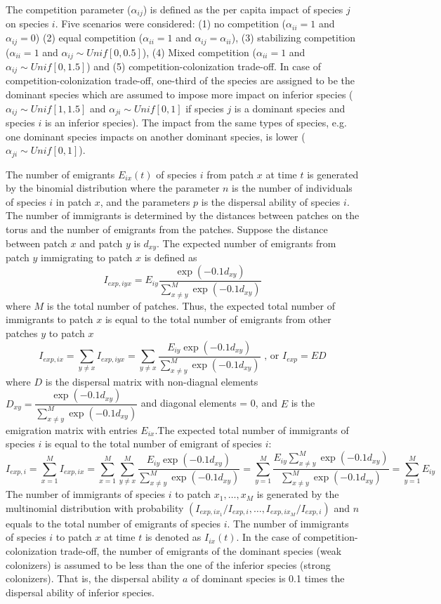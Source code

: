 The competition parameter ($\alpha_{ij}$) is defined as the per capita impact of species $j$ on species $i$. Five scenarios were considered: (1) no competition ($\alpha_{ii}=1$ and $\alpha_{ij}=0$) (2) equal competition ($\alpha_{ii}=1$ and $\alpha_{ij}=\alpha_{ii}$), (3) stabilizing competition ($\alpha_{ii}=1$ and $\alpha_{ij}\sim Unif[0,0.5]$), (4) Mixed competition ($\alpha_{ii}=1$ and $\alpha_{ij}\sim Unif[0,1.5]$) and (5) competition-colonization trade-off. In case of competition-colonization trade-off, one-third of the species are assigned to be the dominant species which are assumed to impose more impact on inferior species ($\alpha_{ij}\sim Unif[1,1.5]$ and $\alpha_{ji}\sim Unif[0,1]$ if species $j$ is a dominant species and species $i$ is an inferior species). The impact from the same types of species, e.g. one dominant species impacts on another dominant species, is lower ($\alpha_{ji}\sim Unif[0,1]$). 

The number of emigrants $E_{ix}(t)$ of species $i$ from patch $x$ at time $t$ is generated by the binomial distribution where the parameter $n$ is the number of individuals of species $i$ in patch $x$, and the parameters $p$ is the dispersal ability of species $i$. The number of immigrants is determined by the distances between patches on the torus and the number of emigrants from the patches. Suppose the distance between patch $x$ and patch $y$ is $d_{xy}$. The expected number of emigrants from patch $y$ immigrating to patch $x$ is defined as 
\[
I_{exp,iyx} = E_{iy}\dfrac{\exp(-0.1d_{xy})}{\sum_{x \neq y}^M \exp(-0.1d_{xy})}
\]
where $M$ is the total number of patches. Thus, the expected total number of immigrants to patch $x$ is equal to the total number of emigrants from other patches $y$ to patch $x$ 
\[
I_{exp,ix} = \sum_{y \neq x} I_{exp,iyx} =  \sum_{y \neq x}\dfrac{E_{iy}\exp(-0.1d_{xy})}{\sum_{x \neq y}^M \exp(-0.1d_{xy})}
\text{ , or }
I_{exp} = ED
\]
where $D$ is the dispersal matrix with non-diagnal elements $D_{xy} = \dfrac{\exp(-0.1d_{xy})}{\sum_{x \neq y}^{M} \exp(-0.1d_{xy})}$ and diagonal elements = 0, and $E$ is the emigration matrix with entries $E_{ix}$.The expected total number of immigrants of species $i$ is equal to the total number of emigrant of species $i$: 
\[
I_{exp,i} = 
\sum_{x = 1}^M I_{exp,ix} = 
\sum_{x = 1}^M \sum_{y \neq x}^M \frac{E_{iy}\exp(-0.1d_{xy})}{\sum_{x \neq y}^{M} \exp(-0.1d_{xy})} = 
\sum_{y = 1}^M \frac{E_{iy} \sum_{x \neq y}^M \exp(-0.1d_{xy})}{\sum_{x \neq y}^{M} \exp(-0.1d_{xy})} =
\sum_{y = 1}^M E_{iy}
\]
The number of immigrants of species $i$ to patch $x_1,\dots,x_M$ is generated by the multinomial distribution with probability $(I_{exp,ix_1}/I_{exp,i},\dots,I_{exp,ix_M}/I_{exp,i})$ and $n$ equals to the total number of emigrants of species $i$. The number of immigrants of species $i$ to patch $x$ at time $t$ is denoted as $I_{ix}(t)$. In the case of competition-colonization trade-off, the number of emigrants of the dominant species (weak colonizers) is assumed to be less than the one of the inferior species (strong colonizers). That is, the dispersal ability $a$ of dominant species is 0.1 times the dispersal ability of inferior species.

